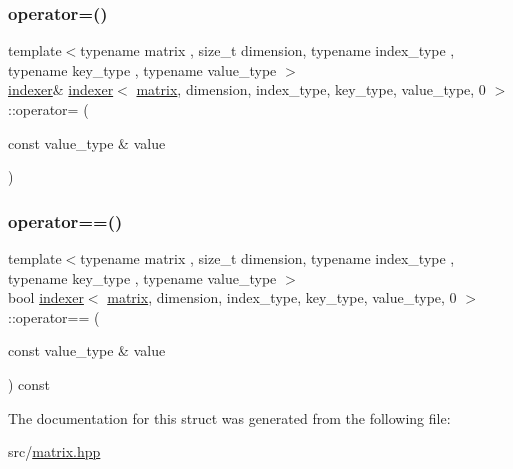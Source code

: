 \mbox{\label{structindexer_3_01matrix_00_01dimension_00_01index__type_00_01key__type_00_01value__type_00_010_01_4_a4dcdfdf6a67aa42f35bbc768b6782586}} 
\subsubsection{\texorpdfstring{operator=()}{operator=()}}
{\footnotesize\ttfamily template$<$typename matrix , size\+\_\+t dimension, typename index\+\_\+type , typename key\+\_\+type , typename value\+\_\+type $>$ \\
\hyperlink{structindexer}{indexer}\& \hyperlink{structindexer}{indexer}$<$ \hyperlink{structmatrix}{matrix}, dimension, index\+\_\+type, key\+\_\+type, value\+\_\+type, 0 $>$\+::operator= (\begin{DoxyParamCaption}\item[{const value\+\_\+type \&}]{value }\end{DoxyParamCaption})\hspace{0.3cm}{\ttfamily [inline]}}

\mbox{\label{structindexer_3_01matrix_00_01dimension_00_01index__type_00_01key__type_00_01value__type_00_010_01_4_a68afd363480074d54a274cc4d55d806d}} 
\subsubsection{\texorpdfstring{operator==()}{operator==()}}
{\footnotesize\ttfamily template$<$typename matrix , size\+\_\+t dimension, typename index\+\_\+type , typename key\+\_\+type , typename value\+\_\+type $>$ \\
bool \hyperlink{structindexer}{indexer}$<$ \hyperlink{structmatrix}{matrix}, dimension, index\+\_\+type, key\+\_\+type, value\+\_\+type, 0 $>$\+::operator== (\begin{DoxyParamCaption}\item[{const value\+\_\+type \&}]{value }\end{DoxyParamCaption}) const\hspace{0.3cm}{\ttfamily [inline]}}



The documentation for this struct was generated from the following file\+:\begin{DoxyCompactItemize}
\item 
src/\hyperlink{matrix_8hpp}{matrix.\+hpp}\end{DoxyCompactItemize}
